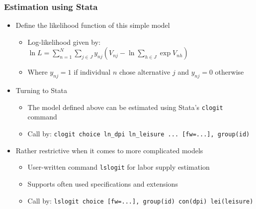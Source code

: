 \documentclass[handout,intlimits]{beamer}
\def\litc#1{\textcolor{med-gray}{\tiny\citep{#1}}}
\def\litf#1{\textcolor{med-gray}{\tiny\citep*{#1}}}
\def\blue#1{\textcolor{zewblue}{#1}}
\begin{document}
\begin{frame}[fragile]
\frametitle{Estimation using Stata}
\begin{itemize}
	\item \blue{Define the likelihood function of this simple model}
	\begin{itemize}
		\item Log-likelihood given by: $\ln L=\sum_{n=1}^N\sum_{j\in J}y_{nj}\left(V_{nj} - \ln\sum_{h\in J}\exp V_{nh}\right)$
		\smallskip
		\item Where $y_{nj}=1$ if individual $n$ chose alternative $j$ and $y_{nj}=0$ otherwise
	\end{itemize}
	\bigskip
	\item \blue{Turning to Stata}
	\begin{itemize}
		\item The model defined above can be estimated using Stata's \verb+clogit+ command
		\smallskip
		\item Call by: \verb+clogit choice ln_dpi ln_leisure ... [fw=...], group(id)+
	\end{itemize}
	\bigskip
	\item \blue{Rather restrictive when it comes to more complicated models}
	\begin{itemize}
		\item User-written command \verb+lslogit+ for labor supply estimation \litc{loeffler_2013}
		\smallskip
		\item Supports often used specifications and extensions \litf{loeffler_etal_2014}
		\smallskip
		\item Call by: \verb+lslogit choice [fw=...], group(id) con(dpi) lei(leisure)+
	\end{itemize}
\end{itemize}
\end{frame}
\end{document}
